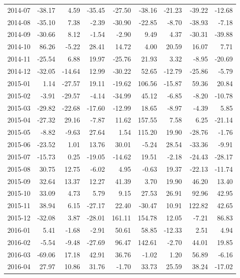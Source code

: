 \begin{table}[ht]
\begin{tabular}{lrrrrrrrr}
  2014-07 & -38.17 & 4.59 & -35.45 & -27.50 & -38.16 & -21.23 & -39.22 & -12.68 \\ 
  2014-08 & -35.10 & 7.38 & -2.39 & -30.90 & -22.85 & -8.70 & -38.93 & -7.18 \\ 
  2014-09 & -30.66 & 8.12 & -1.54 & -2.90 & 9.49 & 4.37 & -30.31 & -39.88 \\ 
  2014-10 & 86.26 & -5.22 & 28.41 & 14.72 & 4.00 & 20.59 & 16.07 & 7.71 \\ 
  2014-11 & -25.54 & 6.88 & 19.97 & -25.76 & 21.93 & 3.32 & -8.95 & -20.69 \\ 
  2014-12 & -32.05 & -14.64 & 12.99 & -30.22 & 52.65 & -12.79 & -25.86 & -5.79 \\ 
  2015-01 & 1.14 & -27.57 & 19.11 & -19.62 & 106.56 & -15.87 & 59.36 & 20.84 \\ 
  2015-02 & -3.91 & -29.57 & -4.14 & -34.99 & 45.12 & -6.85 & -8.20 & -10.78 \\ 
  2015-03 & -29.82 & -22.68 & -17.60 & -12.99 & 18.65 & -8.97 & -4.39 & 5.85 \\ 
  2015-04 & -27.32 & 29.16 & -7.87 & 11.62 & 157.55 & 7.58 & 6.25 & -21.14 \\ 
  2015-05 & -8.82 & -9.63 & 27.64 & 1.54 & 115.20 & 19.90 & -28.76 & -1.76 \\ 
  2015-06 & -23.52 & 1.01 & 13.76 & 30.01 & -5.24 & 28.54 & -33.36 & -9.91 \\ 
  2015-07 & -15.73 & 0.25 & -19.05 & -14.62 & 19.51 & -2.18 & -24.43 & -28.17 \\ 
  2015-08 & 30.75 & 12.75 & -6.02 & 4.95 & -0.63 & 19.37 & -22.13 & -11.74 \\ 
  2015-09 & 32.64 & 13.37 & 12.27 & 41.39 & 3.70 & 19.90 & 46.20 & 13.40 \\ 
  2015-10 & 33.09 & 4.73 & 5.79 & 9.15 & 27.53 & 26.91 & 92.96 & 42.95 \\ 
  2015-11 & 38.94 & 6.15 & -27.17 & 22.40 & -30.47 & 10.91 & 122.82 & 42.65 \\ 
  2015-12 & -32.08 & 3.87 & -28.01 & 161.11 & 154.78 & 12.05 & -7.21 & 86.83 \\ 
  2016-01 & 5.41 & -1.68 & -2.91 & 50.61 & 58.85 & -12.33 & 2.51 & 4.94 \\ 
  2016-02 & -5.54 & -9.48 & -27.69 & 96.47 & 142.61 & -2.70 & 44.01 & 19.85 \\ 
  2016-03 & -69.06 & 17.18 & 42.91 & 36.76 & -1.02 & 1.20 & 56.89 & -6.16 \\ 
  2016-04 & 27.97 & 10.86 & 31.76 & -1.70 & 33.73 & 25.59 & 38.24 & -17.02 \\ 

\end{tabular}
\end{table}
